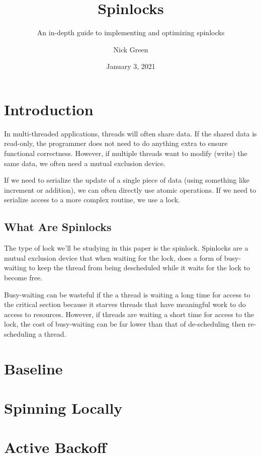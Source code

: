 \documentclass[11pt,fancy,authoryear]{elegantbook}
\title{Spinlocks}
\subtitle{An in-depth guide to implementing and optimizing spinlocks}
\author{Nick Green}
\institute{CoffeeBeforeArch}
\date{January 3, 2021}
\begin{document}
\maketitle

\frontmatter
\tableofcontents

\mainmatter

\chapter{Introduction}

In multi-threaded applications, threads will often share data. If the shared data is read-only, the programmer does not need to do anything extra to ensure functional correctness. However, if multiple threads want to modify (write) the same data, we often need a mutual exclusion device.

If we need to serialize the update of a single piece of data (using something like increment or addition), we can often directly use atomic operations. If we need to serialize access to a more complex routine, we use a lock.

\section{What Are Spinlocks}

The type of lock we'll be studying in this paper is the spinlock. Spinlocks are a mutual exclusion device that when waiting for the lock, does a form of busy-waiting to keep the thread from being descheduled while it waits for the lock to become free.

Busy-waiting can be wasteful if the a thread is waiting a long time for access to the critical section because it starves threads that have meaningful work to do access to resources. However, if threads are waiting a short time for access to the lock, the cost of busy-waiting can be far lower than that of de-scheduling then re-scheduling a thread.

\chapter{Baseline}

\chapter{Spinning Locally}

\chapter{Active Backoff}
\end{document}
